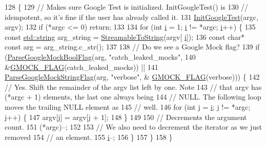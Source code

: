 \begin{DoxyCode}
128                                                     \{
129   \textcolor{comment}{// Makes sure Google Test is initialized.  InitGoogleTest() is}
130   \textcolor{comment}{// idempotent, so it's fine if the user has already called it.}
131   \hyperlink{namespacetesting_afd726ae08c9bd16dc52f78c822d9946b}{InitGoogleTest}(argc, argv);
132   \textcolor{keywordflow}{if} (*argc <= 0) \textcolor{keywordflow}{return};
133 
134   \textcolor{keywordflow}{for} (\textcolor{keywordtype}{int} \hyperlink{gtest__output__test__golden__lin_8txt_a7e98b8a17c0aad30ba64d47b74e2a6c1}{i} = 1; \hyperlink{gtest__output__test__golden__lin_8txt_a7e98b8a17c0aad30ba64d47b74e2a6c1}{i} != *argc; \hyperlink{gtest__output__test__golden__lin_8txt_a7e98b8a17c0aad30ba64d47b74e2a6c1}{i}++) \{
135     \textcolor{keyword}{const} \hyperlink{namespacetesting_1_1internal_a8e8ff5b11e64078831112677156cb111}{std::string} arg\_string = \hyperlink{namespacetesting_1_1internal_aad4beed95d0846e6ffc5da0978ef3bb9}{StreamableToString}(argv[
      \hyperlink{gtest__output__test__golden__lin_8txt_a7e98b8a17c0aad30ba64d47b74e2a6c1}{i}]);
136     \textcolor{keyword}{const} \textcolor{keywordtype}{char}* \textcolor{keyword}{const} arg = arg\_string.c\_str();
137 
138     \textcolor{comment}{// Do we see a Google Mock flag?}
139     \textcolor{keywordflow}{if} (\hyperlink{namespacetesting_1_1internal_a137bff8177d6158f59ab4ce603577293}{ParseGoogleMockBoolFlag}(arg, \textcolor{stringliteral}{"catch\_leaked\_mocks"},
140                                 &\hyperlink{gmock-port_8h_ad7119adfef06be5e7b1551633f5a1436}{GMOCK\_FLAG}(catch\_leaked\_mocks)) ||
141         \hyperlink{namespacetesting_1_1internal_afb359266feb817d9943854b76574817d}{ParseGoogleMockStringFlag}(arg, \textcolor{stringliteral}{"verbose"}, &
      \hyperlink{gmock-port_8h_ad7119adfef06be5e7b1551633f5a1436}{GMOCK\_FLAG}(verbose))) \{
142       \textcolor{comment}{// Yes.  Shift the remainder of the argv list left by one.  Note}
143       \textcolor{comment}{// that argv has (*argc + 1) elements, the last one always being}
144       \textcolor{comment}{// NULL.  The following loop moves the trailing NULL element as}
145       \textcolor{comment}{// well.}
146       \textcolor{keywordflow}{for} (\textcolor{keywordtype}{int} j = \hyperlink{gtest__output__test__golden__lin_8txt_a7e98b8a17c0aad30ba64d47b74e2a6c1}{i}; j != *argc; j++) \{
147         argv[j] = argv[j + 1];
148       \}
149 
150       \textcolor{comment}{// Decrements the argument count.}
151       (*argc)--;
152 
153       \textcolor{comment}{// We also need to decrement the iterator as we just removed}
154       \textcolor{comment}{// an element.}
155       \hyperlink{gtest__output__test__golden__lin_8txt_a7e98b8a17c0aad30ba64d47b74e2a6c1}{i}--;
156     \}
157   \}
158 \}
\end{DoxyCode}
